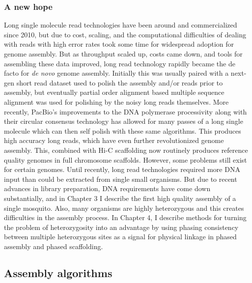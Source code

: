 \subsubsection{A new hope}

\par{
Long single molecule read technologies have been around and commercialized since 2010, but due to cost, scaling, and the computational difficulties of dealing with reads with high error rates took some time for widespread adoption for genome assembly\cite{HGAP}. But as throughput scaled up, costs came down, and tools for assembling these data improved\cite{falcon}\cite{redbean}\cite{canu}, long read technology rapidly became the de facto for \textit{de novo} genome assembly. Initially this was usually paired with a next-gen short read dataset used to polish the assembly and/or reads prior to assembly, but eventually partial order alignment based multiple sequence alignment\cite{partialorder} was used for polishing by the noisy long reads themselves\cite{quiver}. More recently, PacBio's improvements to the DNA polymerase processivity along with their circular consensus technology has allowed for many passes of a long single molecule which can then self polish with these same algorithms. This produces high accuracy long reads, which have even further revolutionized genome assembly\cite{HIFI}. This, combined with Hi-C scaffolding now routinely produces reference quality genomes in full chromosome scaffolds. However, some problems still exist for certain genomes. Until recently, long read technologies required more DNA input than could be extracted from single small organisms. But due to recent advances in library preparation, DNA requirements have come down substantially, and in Chapter 3 I describe the first high quality assembly of a single mosquito. Also, many organisms are highly heterozygous and this creates difficulties in the assembly process. In Chapter 4, I describe methods for turning the problem of heterozygosity into an advantage by using phasing consistency between multiple heterozygous sites as a signal for physical linkage in phased assembly and phased scaffolding.
}

\subsection{Assembly algorithms}


